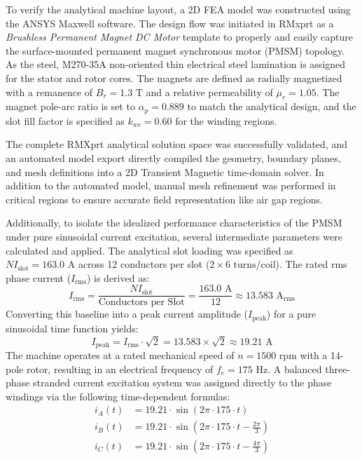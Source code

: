 \documentclass[12pt, a4paper]{article}
\begin{document}
To verify the analytical machine layout, a 2D FEA model was constructed using the ANSYS Maxwell software. The design flow was initiated in RMxprt as a \textit{Brushless Permanent Magnet DC Motor} template to properly and easily capture the surface-mounted permanent magnet synchronous motor (PMSM) topology. As the steel, M270-35A non-oriented thin electrical steel lamination is assigned for the stator and rotor cores. The magnets are defined as radially magnetized with a remanence of $B_r = 1.3\text{ T}$ and a relative permeability of $\mu_r = 1.05$. The magnet pole-arc ratio is set to $\alpha_p = 0.889$ to match the analytical design, and the slot fill factor is specified as $k_{wc} = 0.60$ for the winding regions.

The complete RMXprt analytical solution space was successfully validated, and an automated model export directly compiled the geometry, boundary planes, and mesh definitions into a 2D Transient Magnetic time-domain solver. In addition to the automated model, manual mesh refinement was performed in critical regions to ensure accurate field representation like air gap regions.

Additionally, to isolate the idealized performance characteristics of the PMSM under pure sinusoidal current excitation, several intermediate parameters were calculated and applied. The analytical slot loading was specified as $NI_{\text{slot}} = 163.0\text{ A}$ across 12 conductors per slot ($2 \times 6\text{ turns/coil}$). The rated rms phase current ($I_{\text{rms}}$) is derived as:
\begin{equation}
    I_{\text{rms}} = \frac{NI_{\text{slot}}}{\text{Conductors per Slot}} = \frac{163.0\text{ A}}{12} \approx 13.583\text{ A}_{\text{rms}}
\end{equation}
Converting this baseline into a peak current amplitude ($I_{\text{peak}}$) for a pure sinusoidal time function yields:
\begin{equation}
    I_{\text{peak}} = I_{\text{rms}} \cdot \sqrt{2} = 13.583 \times \sqrt{2} \approx 19.21\text{ A}
\end{equation}
The machine operates at a rated mechanical speed of $n = 1500\text{ rpm}$ with a 14-pole rotor, resulting in an electrical frequency of $f_e = 175\text{ Hz}$. A balanced three-phase stranded current excitation system was assigned directly to the phase windings via the following time-dependent formulas:
\begin{align}
    i_A(t) &= 19.21 \cdot \sin(2\pi \cdot 175 \cdot t) \\
    i_B(t) &= 19.21 \cdot \sin\left(2\pi \cdot 175 \cdot t - \frac{2\pi}{3}\right) \\
    i_C(t) &= 19.21 \cdot \sin\left(2\pi \cdot 175 \cdot t - \frac{4\pi}{3}\right)
\end{align}
\end{document}

